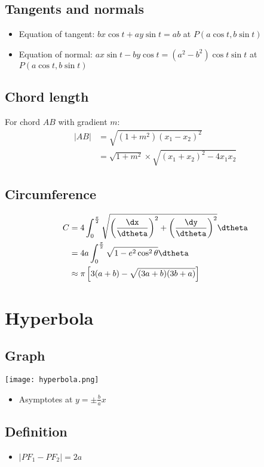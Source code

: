 \subsection{Tangents and normals}
\begin{itemize}
    \item Equation of tangent: $bx\cos t + ay\sin t = ab$ at $P(a\cos t, b\sin t)$
    \item Equation of normal: $ax\sin t - by\cos t=(a^2-b^2)\cos t\sin t$ at $P(a\cos t, b\sin t)$
\end{itemize}
\subsection{Chord length}
For chord $AB$ with gradient $m$:
\begin{align*}
    |AB|&=\sqrt{(1+m^2)(x_1-x_2)^2}\\
    &=\sqrt{1+m^2}\times\sqrt{(x_1+x_2)^2-4x_1x_2}
\end{align*}
\subsection{Circumference}
\begin{align*}
    C &= 4\int_{0}^{\frac{\pi}{2}}\sqrt{\left(\frac{\dx}{\dtheta}\right)^{2}+\left(\frac{\dy}{\dtheta}\right)^{2}}\dtheta\\
    &= 4a\int_{0}^{\frac{\pi}{2}}\sqrt{1-e^2\cos^2\theta}\dtheta\\
    &\approx \pi\left[3(a+b)-\sqrt{(3a+b)(3b+a)}\right]
\end{align*}

\section{Hyperbola}
\subsection{Graph}
\texttt{[image: hyperbola.png]}
\begin{itemize}
    \item Asymptotes at $y=\pm \frac{b}{a}x$
\end{itemize}
\subsection{Definition}
\begin{itemize}
    \item $|PF_1 - PF_2| = 2a$
\end{itemize}
